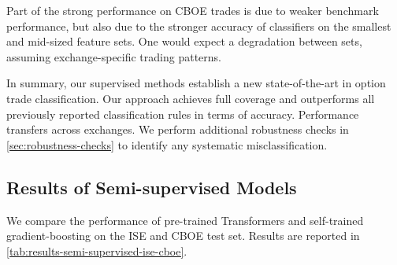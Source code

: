 Part of the strong performance on \gls{CBOE} trades is due to weaker benchmark performance, but also due to the stronger accuracy of classifiers on the smallest and mid-sized feature sets. One would expect a degradation between sets, assuming exchange-specific trading patterns.

In summary, our supervised methods establish a new state-of-the-art in option trade classification. Our approach achieves full coverage and outperforms all previously reported classification rules in terms of accuracy. Performance transfers across exchanges. We perform additional robustness checks in \cref{sec:robustness-checks} to identify any systematic misclassification.

\subsection{Results of Semi-supervised
    Models}\label{sec:results-of-semi-supervised-models}

We compare the performance of pre-trained Transformers and self-trained gradient-boosting on the \gls{ISE} and \gls{CBOE} test set. Results are reported in \cref{tab:results-semi-supervised-ise-cboe}.


